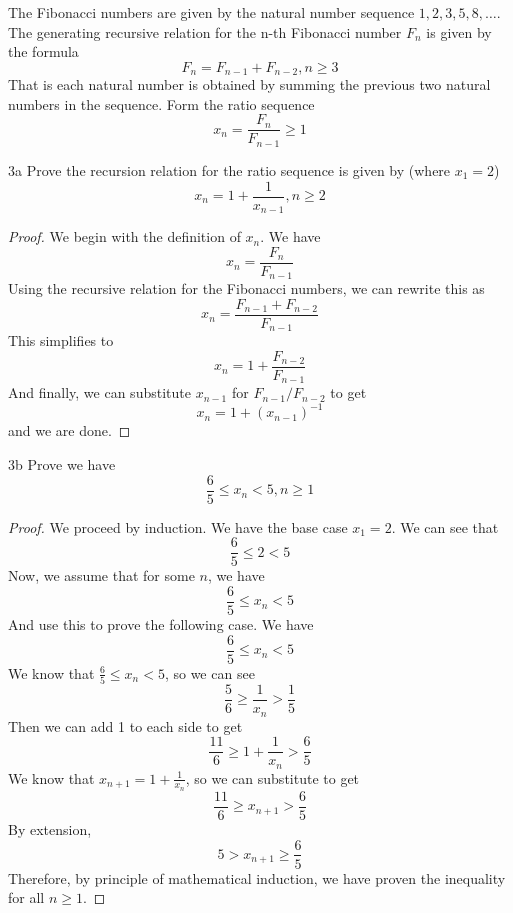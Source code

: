 \documentclass[boxes]{rutgers_hw}
\begin{document}
  \pagebreak
  \begin{exern}{3}

    The Fibonacci numbers are given by the natural number sequence $1,2,3,5,8,\dots$.
    The generating recursive relation for the n-th Fibonacci number $F_n$ is given by the formula
    \[ F_n = F_{n-1} + F_{n-2}, n \ge 3\]
    That is each natural number is obtained by summing the previous two natural numbers in the sequence.
    Form the ratio sequence
    \[ x_n = \frac{F_n}{F_{n-1}} \ge 1\]
    
    \begin{exern}{3a}
      Prove the recursion relation for the ratio sequence is given by (where $x_1 = 2$)
      \[ x_n = 1 + \frac1{x_{n-1}}, n \ge 2\]
    \end{exern}

    \begin{proof}
      We begin with the definition of $x_n$. We have
      \[ x_n = \frac{F_n}{F_{n-1}} \]
      Using the recursive relation for the Fibonacci numbers, we can rewrite this as
      \[ x_n = \frac{F_{n-1} + F_{n-2}}{F_{n-1}} \]
      This simplifies to
      \[ x_n = 1 + \frac{F_{n-2}}{F_{n-1}} \]
      And finally, we can substitute $x_{n-1}$ for $F_{n-1}/F_{n-2}$ to get
      \[ x_n = 1 + {(x_{n-1})}^{-1} \]
      and we are done.
    \end{proof}
    
    \pagebreak

    \begin{exern}{3b}
      Prove we have
      \[ \frac65 \le x_n < 5, n \ge 1\]
    \end{exern}

    \begin{proof}
      We proceed by induction. We have the base case $x_1 = 2$. We can see that
      \[ \frac65 \le 2 < 5\]
      Now, we assume that for some $n$, we have
      \[ \frac65 \le x_n < 5\]
      And use this to prove the following case. We have
      \[ \frac65 \le x_n < 5\]
      We know that $\frac65 \le x_n < 5$, so we can see 
      \[ \frac56 \ge \frac1{x_n} > \frac15\]
      Then we can add 1 to each side to get
      \[ \frac{11}6 \ge 1 + \frac1{x_n} > \frac65\]
      We know that $x_{n+1} = 1 + \frac1{x_n}$, so we can substitute to get
      \[ \frac{11}6 \ge x_{n+1} > \frac65\]
      By extension,
      \[ 5 > x_{n+1} \ge \frac65\]
      Therefore, by principle of mathematical induction, we have proven the inequality for all $n \ge 1$.
    \end{proof}


\end{exern}
\end{document}
